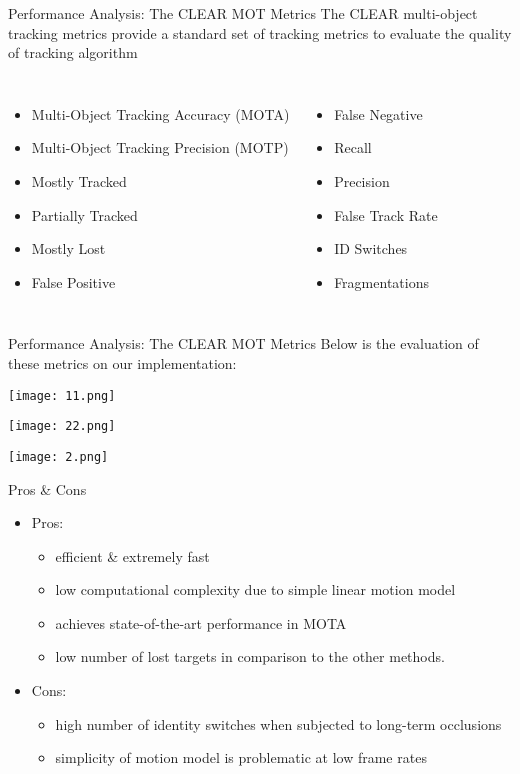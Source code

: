 \documentclass{beamer}
\begin{document}
\begin{frame}[t]{Performance Analysis: The CLEAR MOT Metrics}
The CLEAR multi-object tracking metrics provide a standard set of tracking metrics to evaluate
the quality of tracking algorithm
\begin{columns}[onlytextwidth]
	\begin{itemize}
	\item Multi-Object Tracking Accuracy (MOTA)
	\item Multi-Object Tracking Precision (MOTP)
	\item Mostly Tracked
	\item Partially Tracked 
	\item Mostly Lost     
	\item False Positive    
	\end{itemize}
	\begin{itemize}   
	\item False Negative    
	\item Recall    
	\item Precision    
	\item False Track Rate    
	\item ID Switches    
	\item Fragmentations
	\end{itemize}
\end{columns}
\end{frame}

\begin{frame}[t]{Performance Analysis: The CLEAR MOT Metrics}
Below is the evaluation of these metrics on our implementation:
\begin{center}
\texttt{[image: 11.png]}

\texttt{[image: 22.png]}

\texttt{[image: 2.png]}
\end{center}
\end{frame}

\begin{frame}[t]{Pros \& Cons}
\begin{itemize}
\item Pros:
	\begin{itemize}
	\item efficient \& extremely fast 
	\item low computational complexity due to simple linear motion model
	\item achieves state-of-the-art performance in MOTA
	\item  low number of lost targets in comparison to the other methods.
	\end{itemize}
\item Cons:
	\begin{itemize}
	\item high number of identity switches when subjected to long-term occlusions
	\item simplicity of motion model is problematic at low frame rates
	\end{itemize}
\end{itemize}
\end{frame}
\end{document}
